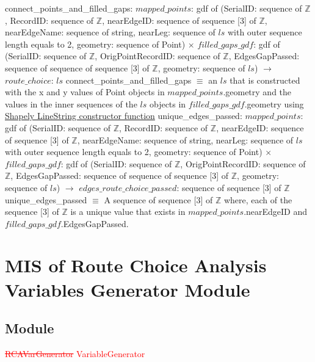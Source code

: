 \documentclass[12pt, titlepage]{article}
\begin{document}
connect\_points\_and\_filled\_gaps: \newline
$mapped\_points$: gdf of (SerialID: sequence of $\mathbb{Z}$, RecordID: sequence of $\mathbb{Z}$, nearEdgeID: sequence of sequence [3] of $\mathbb{Z}$, nearEdgeName: sequence of string, nearLeg: sequence of $ls$ with outer sequence length equals to 2, geometry: sequence of Point) $\times$ $filled\_gaps\_gdf$: gdf of (SerialID: sequence of $\mathbb{Z}$, OrigPointRecordID: sequence of $\mathbb{Z}$, EdgesGapPassed: sequence of sequence of sequence [3] of $\mathbb{Z}$, geometry: sequence of $ls$) $\rightarrow$ $route\_choice$: $ls$\newline
connect\_points\_and\_filled\_gaps $\equiv$ an $ls$ that is constructed with the x and y values of Point objects in $mapped\_points$.geometry and the values in the inner sequences of the $ls$ objects in $filled\_gaps\_gdf$.geometry using \href{https://shapely.readthedocs.io/en/stable/manual.html#LineString}{Shapely LineString constructor function}\newline\newline
unique\_edges\_passed: \newline
$mapped\_points$: gdf of (SerialID: sequence of $\mathbb{Z}$, RecordID: sequence of $\mathbb{Z}$, nearEdgeID: sequence of sequence [3] of $\mathbb{Z}$, nearEdgeName: sequence of string, nearLeg: sequence of $ls$ with outer sequence length equals to 2, geometry: sequence of Point) $\times$ $filled\_gaps\_gdf$: gdf of (SerialID: sequence of $\mathbb{Z}$, OrigPointRecordID: sequence of $\mathbb{Z}$, EdgesGapPassed: sequence of sequence of sequence [3] of $\mathbb{Z}$, geometry: sequence of $ls$) $\rightarrow$ $edges\_route\_choice\_passed$: sequence of sequence [3] of $\mathbb{Z}$\newline
unique\_edges\_passed $\equiv$ A sequence of sequence [3] of $\mathbb{Z}$ where, each of the sequence [3] of $\mathbb{Z}$ is a unique value that exists in $mapped\_points$.nearEdgeID and $filled\_gaps\_gdf$.EdgesGapPassed.

\newpage

\section{MIS of Route Choice Analysis Variables Generator Module} \label{RCAVarGenerator} 

\subsection{Module}
\textcolor{red}{\sout{RCAVarGenerator} VariableGenerator}
\end{document}
